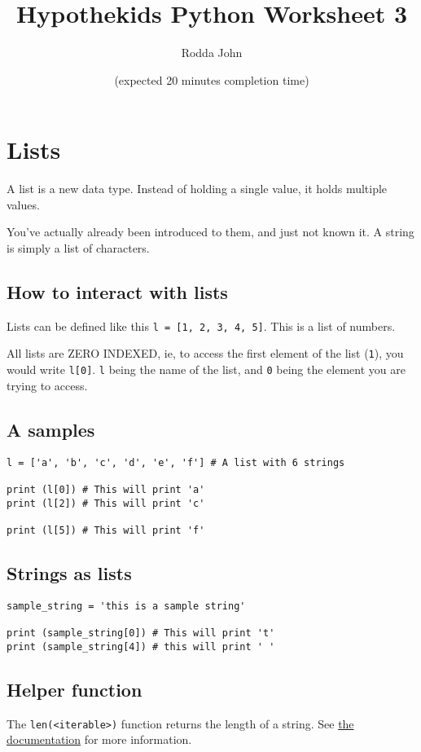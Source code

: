 \documentclass[11pt]{article}
\author{Rodda John}
\date{(expected 20 minutes completion time)}
\title{Hypothekids Python Worksheet 3}
\begin{document}
\maketitle

\section{Lists}
\label{sec:org27ea79c}
A list is a new data type.  Instead of holding a single value, it holds multiple values.

You've actually already been introduced to them, and just not known it.  A string is simply a list of characters.

\subsection{How to interact with lists}
\label{sec:org4402241}
Lists can be defined like this \texttt{l = [1, 2, 3, 4, 5]}.  This is a list of numbers.

All lists are ZERO INDEXED, ie, to access the first element of the list (\texttt{1}), you would write \texttt{l[0]}.  \texttt{l} being the name of the list, and \texttt{0} being the element you are trying to access.

\subsection{A samples}
\label{sec:org2f036d3}

\begin{verbatim}
l = ['a', 'b', 'c', 'd', 'e', 'f'] # A list with 6 strings

print (l[0]) # This will print 'a'
print (l[2]) # This will print 'c'

print (l[5]) # This will print 'f'
\end{verbatim}

\subsection{Strings as lists}
\label{sec:org103f6e7}
\begin{verbatim}
sample_string = 'this is a sample string'

print (sample_string[0]) # This will print 't'
print (sample_string[4]) # this will print ' '
\end{verbatim}

\subsection{Helper function}
\label{sec:orgf66435d}
The \texttt{len(<iterable>)} function returns the length of a string.  See \href{https://docs.python.org/3/library/functions.html\#len}{the documentation} for more information.
\end{document}
